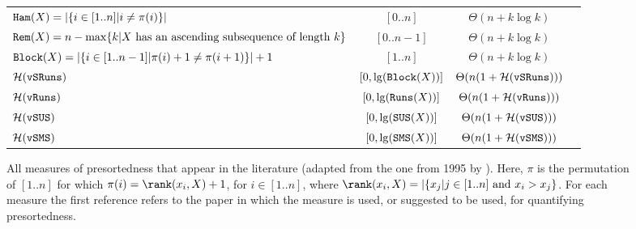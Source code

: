 \begin{figure}
\begin{tabular}{l|c|c|c}
$\mathtt{Ham}(X)=|\{i\in[1..n] | i\neq\pi(i)\}|$  & $[0..n]$ &$\Theta(n + k\log k)$&\cite{} \\
$\mathtt{Rem}(X)=n-\max\{k|X\mbox{ has an ascending subsequence of length $k$}\}$  & $[0..n-1]$ &$\Theta(n + k\log k)$&\cite{} \\
$\mathtt{Block}(X)=|\{i\in[1..n-1] | \pi(i)+1 \neq \pi(i+1)\}|+1$  & $[1..n]$ &$\Theta(n + k\log k)$&\cite{1993-Algoritmica-SulinearMergingAndnaturalMergeSort-CarlssonLevcopoulosPetersson} \\
${\cal H}(\mathtt{vSRuns})$  & $[0,\lg(\mathtt{Block}(X))]$ & $\Theta(n(1+{\cal H}(\mathtt{vSRuns})))$ & \cite{2009-STACS-CompressedRepresentationsOfPermutationsAndApplications-BarbayNavarro,2013-TCS-CompressedRepresentationsOfPermutationsAndApplications-BarbayNavarro} \\
${\cal H}(\mathtt{vRuns})$  & $[0,\lg(\mathtt{Runs}(X))]$ & $\Theta(n(1+{\cal H}(\mathtt{vRuns})))$ & \cite{2009-STACS-CompressedRepresentationsOfPermutationsAndApplications-BarbayNavarro,2013-TCS-CompressedRepresentationsOfPermutationsAndApplications-BarbayNavarro} \\
${\cal H}(\mathtt{vSUS})$  & $[0,\lg(\mathtt{SUS}(X))]$ & $\Theta(n(1+{\cal H}(\mathtt{vSUS})))$ & \cite{2009-STACS-CompressedRepresentationsOfPermutationsAndApplications-BarbayNavarro,2013-TCS-CompressedRepresentationsOfPermutationsAndApplications-BarbayNavarro} \\
${\cal H}(\mathtt{vSMS})$  & $[0,\lg(\mathtt{SMS}(X))]$ & $\Theta(n(1+{\cal H}(\mathtt{vSMS})))$ &   
\cite{2009-STACS-CompressedRepresentationsOfPermutationsAndApplications-BarbayNavarro,2013-TCS-CompressedRepresentationsOfPermutationsAndApplications-BarbayNavarro} \\
\end{tabular}
\caption{All measures of presortedness that appear in the literature (adapted from the one from 1995 by \textcite{1995-DAM-AFrameworkForAdaptiveSorting-PeterssonMoffat}). Here, $\pi$ is the permutation of $[1..n]$ for which $\pi(i)=\rank(x_i,X)+1$, for $i\in[1..n]$, where $\rank(x_i,X)=|\{ x_j | j\in[1..n] \mbox{ and } x_i>x_j\}$. For each measure the first reference refers to the paper in which the measure is used, or suggested to be used, for quantifying presortedness.}
\label{fig:DefinitionsOfMeasuresOfDisorder}
\end{figure}


